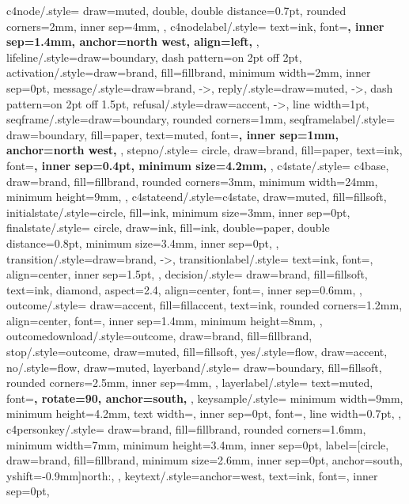 {  c4node/.style={
    draw=muted, double, double distance=0.7pt, rounded corners=2mm,
    inner sep=4mm,
  },
  c4nodelabel/.style={
    text=ink, font=\sffamily\scriptsize\bfseries, inner sep=1.4mm,
    anchor=north west, align=left,
  },
  lifeline/.style={draw=boundary, dash pattern=on 2pt off 2pt},
  activation/.style={draw=brand, fill=fillbrand, minimum width=2mm, inner sep=0pt},
  message/.style={draw=brand, ->},
  reply/.style={draw=muted, ->, dash pattern=on 2pt off 1.5pt},
  refusal/.style={draw=accent, ->, line width=1pt},
  seqframe/.style={draw=boundary, rounded corners=1mm},
  seqframelabel/.style={
    draw=boundary, fill=paper, text=muted, font=\sffamily\scriptsize\bfseries,
    inner sep=1mm, anchor=north west,
  },
  stepno/.style={
    circle, draw=brand, fill=paper, text=ink, font=\sffamily\scriptsize\bfseries,
    inner sep=0.4pt, minimum size=4.2mm,
  },
  c4state/.style={
    c4base, draw=brand, fill=fillbrand, rounded corners=3mm, minimum width=24mm,
    minimum height=9mm,
  },
  c4stateend/.style={c4state, draw=muted, fill=fillsoft},
  initialstate/.style={circle, fill=ink, minimum size=3mm, inner sep=0pt},
  finalstate/.style={
    circle, draw=ink, fill=ink, double=paper, double distance=0.8pt,
    minimum size=3.4mm, inner sep=0pt,
  },
  transition/.style={draw=brand, ->},
  transitionlabel/.style={
    text=ink, font=\ttfamily\scriptsize, align=center, inner sep=1.5pt,
  },
  decision/.style={
    draw=brand, fill=fillsoft, text=ink, diamond, aspect=2.4,
    align=center, font=\sffamily\scriptsize, inner sep=0.6mm,
  },
  outcome/.style={
    draw=accent, fill=fillaccent, text=ink, rounded corners=1.2mm,
    align=center, font=\sffamily\scriptsize, inner sep=1.4mm, minimum height=8mm,
  },
  outcomedownload/.style={outcome, draw=brand, fill=fillbrand},
  stop/.style={outcome, draw=muted, fill=fillsoft},
  yes/.style={flow, draw=accent},
  no/.style={flow, draw=muted},
  layerband/.style={
    draw=boundary, fill=fillsoft, rounded corners=2.5mm, inner sep=4mm,
  },
  layerlabel/.style={
    text=muted, font=\sffamily\scriptsize\bfseries, rotate=90, anchor=south,
  },
  keysample/.style={
    minimum width=9mm, minimum height=4.2mm, text width={}, inner sep=0pt,
    font=\tiny, line width=0.7pt,
  },
  c4personkey/.style={
    draw=brand, fill=fillbrand, rounded corners=1.6mm, minimum width=7mm,
    minimum height=3.4mm, inner sep=0pt,
    label={[circle, draw=brand, fill=fillbrand, minimum size=2.6mm, inner sep=0pt,
            anchor=south, yshift=-0.9mm]north:{}},
  },
  keytext/.style={anchor=west, text=ink, font=\sffamily\scriptsize, inner sep=0pt},
}

